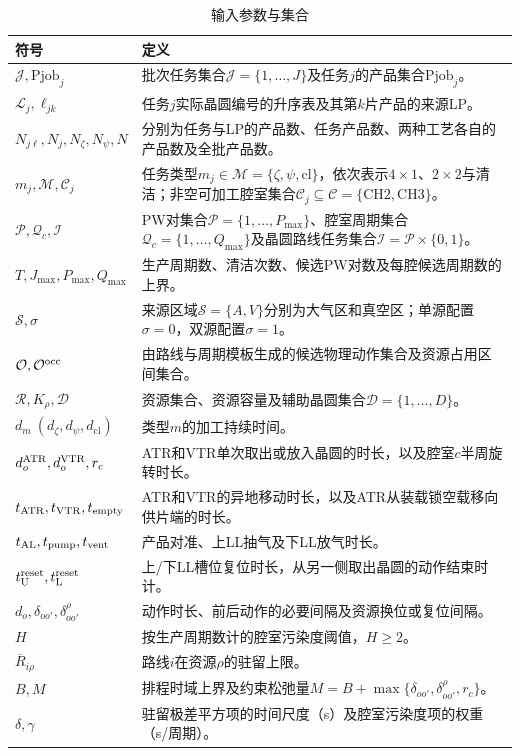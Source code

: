 \documentclass[final,5p,times,twocolumn]{elsarticle}
\begin{document}
\begin{table}[!t]
\centering\small
\caption{输入参数与集合}
\label{tab:symbol-cn-a}
\renewcommand{\arraystretch}{1.03}
\setlength{\tabcolsep}{4pt}
\begin{tabular}{@{}C{0.20\textwidth}C{\textwidth-8pt\relax}@{}}
\toprule
符号 & 定义\\\midrule
$\mathcal J,\mathrm{Pjob}_j$ & 批次任务集合$\mathcal J=\{1,\ldots,J\}$及任务$j$的产品集合$\mathrm{Pjob}_j$。\\
$\mathcal L_j,\ell_{jk}$ & 任务$j$实际晶圆编号的升序表及其第$k$片产品的来源LP。\\
$N_{j\ell},N_j,N_\zeta,N_\psi,N$ & 分别为任务与LP的产品数、任务产品数、两种工艺各自的产品数及全批产品数。\\
$m_j,\mathcal M,\mathcal C_j$ & 任务类型$m_j\in\mathcal M=\{\zeta,\psi,\mathrm{cl}\}$，依次表示$4\times1$、$2\times2$与清洁；非空可加工腔室集合$\mathcal C_j\subseteq\mathcal C=\{\mathrm{CH2},\mathrm{CH3}\}$。\\
$\mathcal P,\mathcal Q_c,\mathcal I$ & PW对集合$\mathcal P=\{1,\ldots,P_{\max}\}$、腔室周期集合$\mathcal Q_c=\{1,\ldots,Q_{\max}\}$及晶圆路线任务集合$\mathcal I=\mathcal P\times\{0,1\}$。\\
$T,J_{\max},P_{\max},Q_{\max}$ & 生产周期数、清洁次数、候选PW对数及每腔候选周期数的上界。\\
$\mathcal S,\sigma$ & 来源区域$\mathcal S=\{A,V\}$分别为大气区和真空区；单源配置$\sigma=0$，双源配置$\sigma=1$。\\
$\mathcal O,\mathcal O^{\rm occ}$ & 由路线与周期模板生成的候选物理动作集合及资源占用区间集合。\\
$\mathcal R,K_\rho,\mathcal D$ & 资源集合、资源容量及辅助晶圆集合$\mathcal D=\{1,\ldots,D\}$。\\
$d_m\ (d_\zeta,d_\psi,d_{\mathrm{cl}})$ & 类型$m$的加工持续时间。\\
$d_o^{\rm ATR},d_o^{\rm VTR},r_c$ & ATR和VTR单次取出或放入晶圆的时长，以及腔室$c$半周旋转时长。\\
$t_{\rm ATR},t_{\rm VTR},t_{\rm empty}$ & ATR和VTR的异地移动时长，以及ATR从装载锁空载移向供片端的时长。\\
$t_{\rm AL},t_{\rm pump},t_{\rm vent}$ & 产品对准、上LL抽气及下LL放气时长。\\
$t_{\rm U}^{\rm reset},t_{\rm L}^{\rm reset}$ & 上/下LL槽位复位时长，从另一侧取出晶圆的动作结束时计。\\
$d_o,\delta_{oo'},\delta^\rho_{oo'}$ & 动作时长、前后动作的必要间隔及资源换位或复位间隔。\\
$H$ & 按生产周期数计的腔室污染度阈值，$H\ge2$。\\
$\overline R_{i\rho}$ & 路线$i$在资源$\rho$的驻留上限。\\
$B,M$ & 排程时域上界及约束松弛量$M=B+\max\{\delta_{oo'},\delta^\rho_{oo'},r_c\}$。\\
$\delta,\gamma$ & 驻留极差平方项的时间尺度（s）及腔室污染度项的权重（s/周期）。\\
\bottomrule
\end{tabular}
\end{table}
\end{document}
